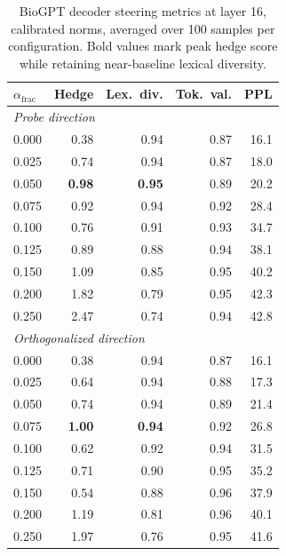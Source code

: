 \documentclass[11pt,a4paper]{article}
\begin{document}
\begin{table}[ht]
\centering
\caption{BioGPT decoder steering metrics at layer 16, calibrated norms,
  averaged over 100 samples per configuration. Bold values mark peak
  hedge score while retaining near-baseline lexical diversity.}
\label{tab:steering_app}
\begin{tabular}{lrrrr}
\toprule
$\alpha_{\mathrm{frac}}$ & Hedge & Lex.~div. & Tok.~val. & PPL \\
\midrule
\multicolumn{5}{l}{\textit{Probe direction}} \\
0.000 & 0.38 & 0.94 & 0.87 & 16.1 \\
0.025 & 0.74 & 0.94 & 0.87 & 18.0 \\
0.050 & \textbf{0.98} & \textbf{0.95} & 0.89 & 20.2 \\
0.075 & 0.92 & 0.94 & 0.92 & 28.4 \\
0.100 & 0.76 & 0.91 & 0.93 & 34.7 \\
0.125 & 0.89 & 0.88 & 0.94 & 38.1 \\
0.150 & 1.09 & 0.85 & 0.95 & 40.2 \\
0.200 & 1.82 & 0.79 & 0.95 & 42.3 \\
0.250 & 2.47 & 0.74 & 0.94 & 42.8 \\
\midrule
\multicolumn{5}{l}{\textit{Orthogonalized direction}} \\
0.000 & 0.38 & 0.94 & 0.87 & 16.1 \\
0.025 & 0.64 & 0.94 & 0.88 & 17.3 \\
0.050 & 0.74 & 0.94 & 0.89 & 21.4 \\
0.075 & \textbf{1.00} & \textbf{0.94} & 0.92 & 26.8 \\
0.100 & 0.62 & 0.92 & 0.94 & 31.5 \\
0.125 & 0.71 & 0.90 & 0.95 & 35.2 \\
0.150 & 0.54 & 0.88 & 0.96 & 37.9 \\
0.200 & 1.19 & 0.81 & 0.96 & 40.1 \\
0.250 & 1.97 & 0.76 & 0.95 & 41.6 \\
\bottomrule
\end{tabular}
\end{table}



\end{document}

